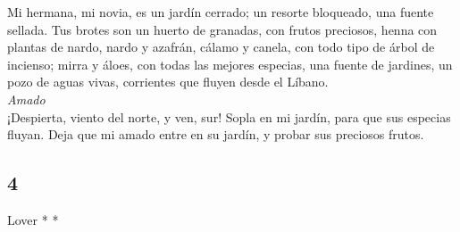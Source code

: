 \begin{paracol}{2}
 Mi hermana, mi novia, es un jardín cerrado; un resorte
bloqueado, una fuente sellada.  Tus brotes son un huerto
de granadas, con frutos preciosos, henna con plantas de nardo,
 nardo y azafrán, cálamo y canela, con todo tipo de árbol
de incienso; mirra y áloes, con todas las mejores especias,
 una fuente de jardines, un pozo de aguas vivas,
corrientes que fluyen desde el Líbano.\\
\emph{Amado}\\
 ¡Despierta, viento del norte, y ven, sur! Sopla en mi
jardín, para que sus especias fluyan. Deja que mi amado entre en su
jardín, y probar sus preciosos frutos.

\switchcolumn
\begin{otherlanguage}{english}

\hypertarget{section-7}{%
\section{4}\label{section-7}}

\emph{\hfill\break
}Lover * *\\


\end{otherlanguage}
\end{paracol}

